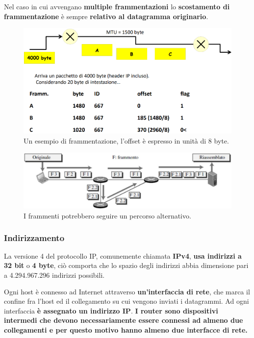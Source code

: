 \documentclass[11pt,a4paper,oneside]{book}
\theoremstyle{definition}
\begin{document}
\begin{itemize}
	      Nel caso in cui avvengano \textbf{multiple frammentazioni} lo \textbf{scostamento di frammentazione} è sempre \textbf{relativo al datagramma originario}.

	      \begin{figure}[!h]
		      \includegraphics[scale=0.3]{Immagini/Ip_frag.png}
		      \centering
		      \caption{Un esempio di frammentazione, l'offset è espresso in unità di 8 byte.}
	      \end{figure}

\end{itemize}

\pagebreak

\begin{figure}[!h]
	\includegraphics[scale=0.25]{Immagini/Ip_frag1.png}
	\centering
	\caption{I frammenti potrebbero seguire un percorso alternativo.}
\end{figure}

\subsubsection{Indirizzamento}
La versione 4 del protocollo IP, comunemente chiamata \textbf{IPv4}, \textbf{usa indirizzi a 32 bit} o \textbf{4 byte}, ciò comporta che lo spazio degli indirizzi abbia dimensione pari a 4.294.967.296 indirizzi possibili.

Ogni host è connesso ad Internet attraverso \textbf{un'interfaccia di rete}, che marca il confine fra l'host ed il collegamento su cui vengono inviati i datagrammi. Ad ogni interfaccia \textbf{è assegnato un indirizzo IP}. \textbf{I router sono dispositivi intermedi che devono necessariamente essere connessi ad almeno due collegamenti e per questo motivo hanno almeno due interfacce di rete.}
\end{document}

